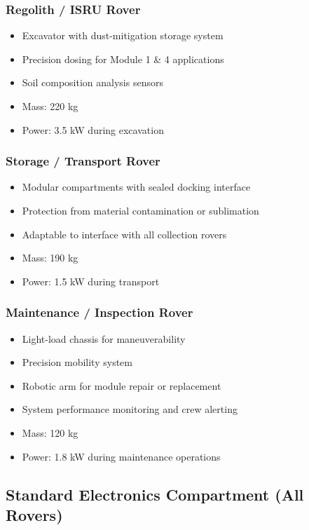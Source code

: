 \documentclass[12pt, a4paper]{article}
\begin{document}
\subsubsection{Regolith / ISRU Rover}
\begin{itemize}
    \item Excavator with dust-mitigation storage system
    \item Precision dosing for Module 1 \& 4 applications
    \item Soil composition analysis sensors
    \item Mass: 220 kg
    \item Power: 3.5 kW during excavation
\end{itemize}

\subsubsection{Storage / Transport Rover}
\begin{itemize}
    \item Modular compartments with sealed docking interface
    \item Protection from material contamination or sublimation
    \item Adaptable to interface with all collection rovers
    \item Mass: 190 kg
    \item Power: 1.5 kW during transport
\end{itemize}

\subsubsection{Maintenance / Inspection Rover}
\begin{itemize}
    \item Light-load chassis for maneuverability
    \item Precision mobility system
    \item Robotic arm for module repair or replacement
    \item System performance monitoring and crew alerting
    \item Mass: 120 kg
    \item Power: 1.8 kW during maintenance operations
\end{itemize}

\subsection{Standard Electronics Compartment (All Rovers)}
\end{document}
